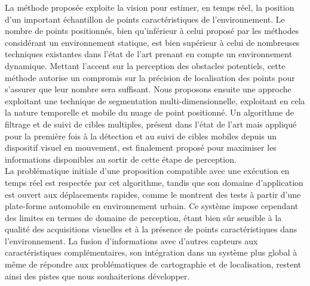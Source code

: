La méthode proposée exploite la vision pour estimer, en temps réel, la position d'un important échantillon de points caractéristiques de l'environnement. Le nombre de points positionnés, bien qu'inférieur à celui proposé par les méthodes considérant un environnement statique, est bien supérieur à celui de nombreuses techniques existantes dans l'état de l'art prenant en compte un environnement dynamique. Mettant l'accent sur la perception des obstacles potentiels, cette méthode autorise un compromis sur la précision de localisation des points pour s'assurer que leur nombre sera suffisant. Nous proposons ensuite une approche exploitant une technique de segmentation multi-dimensionnelle, exploitant en cela la nature temporelle et mobile du nuage de point positionné. Un algorithme de filtrage et de suivi de cibles multiples, présent dans l'état de l'art mais appliqué pour la première fois à la détection et au suivi de cibles mobiles depuis un dispositif visuel en mouvement, est finalement proposé pour maximiser les informations disponibles au sortir de cette étape de perception.\\

La problématique initiale d'une proposition compatible avec une exécution en temps réel est respectée par cet algorithme, tandis que son domaine d'application est ouvert aux déplacements rapides, comme le montrent des tests à partir d'une plate-forme automobile en environnement urbain. Ce système impose cependant des limites en termes de domaine de perception, étant bien sûr sensible à la qualité des acquisitions visuelles et à la présence de points caractéristiques dans l'environnement. La fusion d'informations avec d'autres capteurs aux caractéristiques complémentaires, son intégration dans un système plus global à même de répondre aux problématiques de cartographie et de localisation, restent ainsi des pistes que nous souhaiterions développer.

